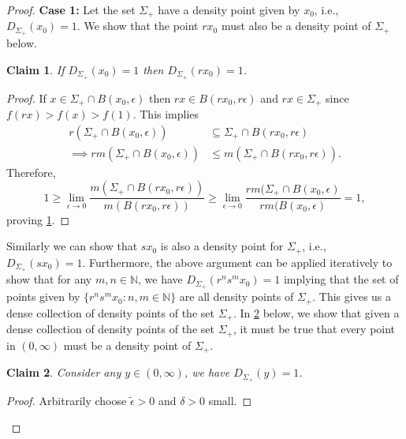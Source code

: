 \documentclass{article}
\newtheorem{claim}{Claim}
\newcommand{\N}{\mathbb{N}}
\begin{document}
\begin{proof}[Proof]
  {\bf Case 1:} Let the set ${\Sigma_+}$ have a density point given
  by $x_0$, i.e., $D_{\Sigma_+}
  (x_0)=1$.
  We show that the point $rx_0$ must also be a density
  point of ${\Sigma_+}$ below.
\begin{leftbar}
  \begin{claim}\label{cl1}
    If $D_{\Sigma_+}(x_0)=1$ then $D_{\Sigma_+}(rx_0)=1$.
  \end{claim}
  \begin{proof}
    If $x\in\Sigma_+\cap B(x_0,\epsilon)$ then $rx\in
    B(rx_0,r\epsilon)$ and $rx\in\Sigma_+$ since $f(rx)>f(x)>f(1)$.
    This implies
    \begin{align*}
      r \left( \Sigma_+ \cap B(x_0,\epsilon) \right) & \subseteq \Sigma_+\cap
      B(rx_0,r\epsilon)  \\
      \implies r m(\Sigma_+ \cap B(x_0,\epsilon)) & \leq m (\Sigma_+\cap
      B(rx_0,r\epsilon)).
    \end{align*}
    Therefore,
    \begin{equation*}
      \label{eq:1}
     1\geq \lim_{\epsilon\rightarrow 0} \frac{m( \Sigma_+\cap
      B(rx_0,r\epsilon))}{m(B(rx_0,r\epsilon))} \geq
      \lim_{\epsilon\rightarrow 0} \frac{rm(\Sigma_+\cap
      B(x_0,\epsilon)}{rm(B(x_0,\epsilon)} = 1,
    \end{equation*}
   proving \cref{cl1}.\end{proof}
\end{leftbar}
  Similarly we can show that $sx_0$ is also a density point for
  ${\Sigma_+}$, i.e., $D_{\Sigma_+}(sx_0)=1$. Furthermore, the above  argument can be applied iteratively to show that
 for any $m,n\in\N$, we have $D_{\Sigma_+}(r^n s^m x_0)=1$ implying that
 the set of points given by
 $\{r^n s^m x_0:n,m\in\N\}$  are all density points of $\Sigma_+$.
  This gives us a dense collection of density points of the set
  $\Sigma_+$.
  In \cref{cl2} below, we show that given a dense collection of density points of the
  set ${\Sigma_+}$, it must be true that every point in $(0,\infty)$ must be
  a density point of $\Sigma_+$.
 \begin{leftbar}
 \begin{claim}\label{cl2}
    Consider any $y\in(0,\infty)$, we have $D_{\Sigma_+}(y)=1$.
  \end{claim}
  \begin{proof}
    Arbitrarily choose $\tilde\epsilon>0$ and $\delta>0$ small.


\end{proof}
\end{leftbar}
\end{proof}
\end{document}
